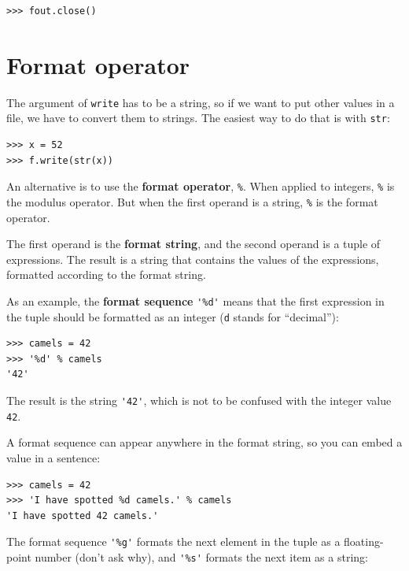 \documentclass[10pt]{book}
\begin{document}
\beforeverb
\begin{verbatim}
>>> fout.close()
\end{verbatim}
\afterverb
%



\section{Format operator}


The argument of {\tt write} has to be a string, so if we want
to put other values in a file, we have to convert them to
strings.  The easiest way to do that is with {\tt str}:

\beforeverb
\begin{verbatim}
>>> x = 52
>>> f.write(str(x))
\end{verbatim}
\afterverb
%
An alternative is to use the {\bf format operator}, {\tt \%}.  When
applied to integers, {\tt \%} is the modulus operator.  But
when the first operand is a string, {\tt \%} is the format operator.


The first operand is the {\bf format string}, and the second operand
is a tuple of expressions.  The result is a string that contains
the values of the expressions, formatted according to the format
string.


As an example, the {\bf format sequence} \verb"'%d'" means that
the first expression in the tuple should be formatted as an
integer ({\tt d} stands for ``decimal''):

\beforeverb
\begin{verbatim}
>>> camels = 42
>>> '%d' % camels
'42'
\end{verbatim}
\afterverb
%
The result is the string \verb"'42'", which is not to be confused
with the integer value {\tt 42}.

A format sequence can appear anywhere in the format string,
so you can embed a value in a sentence:

\beforeverb
\begin{verbatim}
>>> camels = 42
>>> 'I have spotted %d camels.' % camels
'I have spotted 42 camels.'
\end{verbatim}
\afterverb
%
The format sequence \verb"'%g'" formats the next element in the tuple
as a floating-point number (don't ask why), and \verb"'%s'" formats
the next item as a string:
\end{document}
